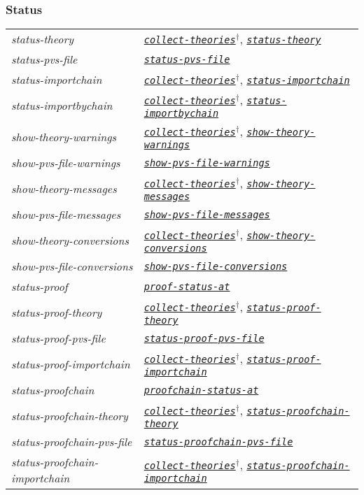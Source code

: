 \documentclass[12pt]{book}
\newcommand{\functionnm}[1]{\texttt{\textit{#1}}}
\newcommand{\functionhln}[1]{\hyperlink{#1}{\functionnm{#1}}}
\begin{document}
\subsubsection{Status}
\noindent\begin{tabularx}{\linewidth}{|>{\itshape\ttfamily}l|>{\raggedright\arraybackslash}X|}\hline
  status-theory & \functionhln{collect-theories}$^\dagger$,
                  \functionhln{status-theory} \\
  status-pvs-file & \functionhln{status-pvs-file} \\
  status-importchain & \functionhln{collect-theories}$^\dagger$,
                       \functionhln{status-importchain} \\
  status-importbychain & \functionhln{collect-theories}$^\dagger$,
                         \functionhln{status-importbychain} \\
  show-theory-warnings & \functionhln{collect-theories}$^\dagger$,
                         \functionhln{show-theory-warnings} \\
  show-pvs-file-warnings & \functionhln{show-pvs-file-warnings} \\
  show-theory-messages & \functionhln{collect-theories}$^\dagger$,
                         \functionhln{show-theory-messages} \\
  show-pvs-file-messages & \functionhln{show-pvs-file-messages} \\
  show-theory-conversions & \functionhln{collect-theories}$^\dagger$,
                            \functionhln{show-theory-conversions} \\
  show-pvs-file-conversions & \functionhln{show-pvs-file-conversions} \\
  status-proof & \functionhln{proof-status-at} \\
  status-proof-theory & \functionhln{collect-theories}$^\dagger$,
                        \functionhln{status-proof-theory} \\
  status-proof-pvs-file & \functionhln{status-proof-pvs-file} \\
  status-proof-importchain & \functionhln{collect-theories}$^\dagger$,
                             \functionhln{status-proof-importchain} \\
  status-proofchain & \functionhln{proofchain-status-at} \\
  status-proofchain-theory & \functionhln{collect-theories}$^\dagger$,
                             \functionhln{status-proofchain-theory} \\
  status-proofchain-pvs-file & \functionhln{status-proofchain-pvs-file} \\
  status-proofchain-importchain & \functionhln{collect-theories}$^\dagger$,
                                  \functionhln{status-proofchain-importchain} \\ \hline
\end{tabularx}
\end{document}

